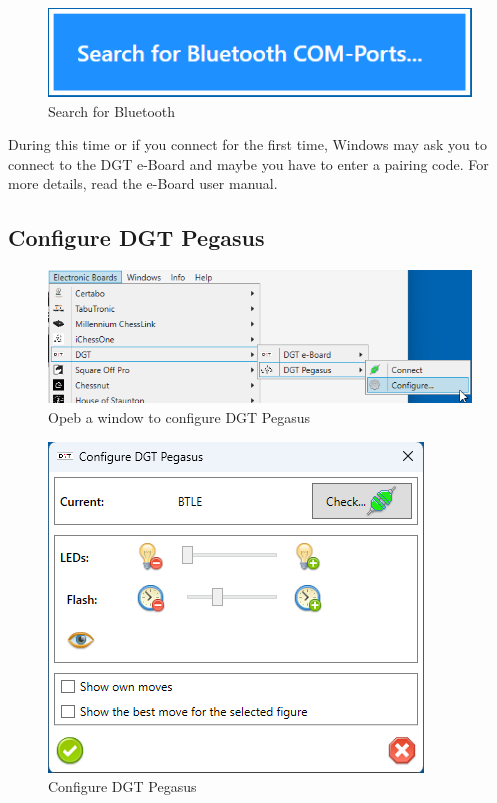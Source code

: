 \documentclass[11pt,a4paper]{article}
\begin{document}
\begin{figure}[H]
	\centering
	\includegraphics[scale=0.8]{MillenniumChessLink10.png}
	\caption{Search for Bluetooth}
	\label{fig:DGTEBoardBT}
\end{figure}

During this time or if you connect for the first time, Windows may ask you to connect to the DGT e-Board and maybe you have to enter a pairing code. For more details, read the e-Board user manual.\\


\subsection{Configure DGT Pegasus} \label{ConfigurePegasus}
\begin{figure}[H]
	\centering
	\includegraphics[scale=0.8]{Pegasus1.png}
	\caption{Opeb a window to configure DGT Pegasus}
	\label{fig:Pegasus1}
\end{figure}

\begin{figure}[H]
	\centering
	\includegraphics[scale=1.0]{Pegasus6.png}
	\caption{Configure DGT Pegasus}
	\label{fig:Pegasus6}
\end{figure}
\end{document}
